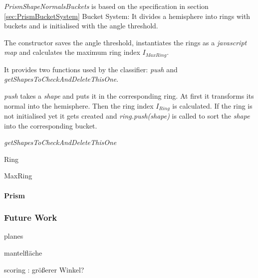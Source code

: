 \documentclass[../ClassicThesis.tex]{subfiles}
\begin{document}
\emph{PrismShapeNormalsBuckets} is based on the specification in section \ref{sec:PrismBucketSystem} Bucket System: It divides a hemisphere into rings with buckets and is initialised with the angle threshold.

The constructor saves the angle threshold, instantiates the rings as a \emph{javascript map} and calculates the maximum ring index $I_{MaxRing}$.

It provides two functions used by the classifier: \emph{push} and \emph{getShapesToCheckAndDeleteThisOne}.

\emph{push} takes a \emph{shape} and puts it in the corresponding ring. At first it transforms its normal into the hemisphere. Then the ring index $ I_{Ring} $ is calculated. If the ring is not initialised yet it gets created and \emph{ring.push(shape)} is called to sort the \emph{shape} into the corresponding bucket.

\emph{getShapesToCheckAndDeleteThisOne}


Ring

MaxRing

\paragraph{Prism}

\subsubsection{Future Work}
\label{sec:PrismFutureWork}

planes

mantelfläche

scoring : größerer Winkel?
\end{document}
